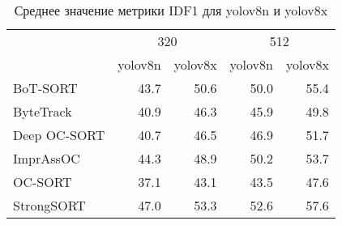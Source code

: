 \begin{table}[htbp]

\caption{Среднее значение метрики IDF1 для yolov8n и yolov8x}
\label{tab:mean_idf1_yolo_size}
\centering
\begin{tabular}{lrrrr}
 & \multicolumn{2}{c}{320} & \multicolumn{2}{c}{512} \\
  & yolov8n & yolov8x & yolov8n & yolov8x \\
\midrule
BoT-SORT & 43.7 & 50.6 & 50.0 & 55.4 \\
ByteTrack & 40.9 & 46.3 & 45.9 & 49.8 \\
Deep OC-SORT & 40.7 & 46.5 & 46.9 & 51.7 \\
ImprAssOC & 44.3 & 48.9 & 50.2 & 53.7 \\
OC-SORT & 37.1 & 43.1 & 43.5 & 47.6 \\
StrongSORT & 47.0 & 53.3 & 52.6 & 57.6 \\
\bottomrule
\end{tabular}\end{table}